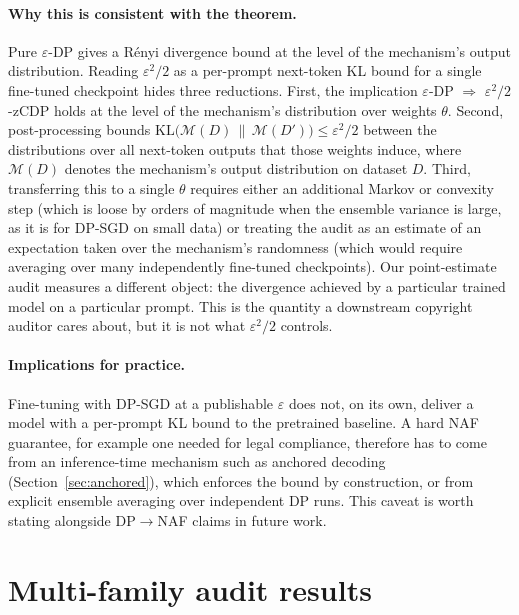 \documentclass{article}
\begin{document}
\paragraph{Why this is consistent with the theorem.}
Pure $\varepsilon$-DP gives a R\'enyi divergence bound at the level of the mechanism's output distribution.  Reading $\varepsilon^2/2$ as a per-prompt next-token KL bound for a single fine-tuned checkpoint hides three reductions.  First, the implication $\varepsilon$-DP $\Rightarrow$ $\varepsilon^2/2$-zCDP holds at the level of the mechanism's distribution over weights $\theta$.  Second, post-processing bounds $\mathrm{KL}\bigl(\mathcal M(D)\,\|\,\mathcal M(D')\bigr)\le\varepsilon^2/2$ between the distributions over all next-token outputs that those weights induce, where $\mathcal M(D)$ denotes the mechanism's output distribution on dataset $D$.  Third, transferring this to a single $\theta$ requires either an additional Markov or convexity step (which is loose by orders of magnitude when the ensemble variance is large, as it is for DP-SGD on small data) or treating the audit as an estimate of an expectation taken over the mechanism's randomness (which would require averaging over many independently fine-tuned checkpoints).  Our point-estimate audit measures a different object: the divergence achieved by a particular trained model on a particular prompt.  This is the quantity a downstream copyright auditor cares about, but it is not what $\varepsilon^2/2$ controls.

\paragraph{Implications for practice.}
Fine-tuning with DP-SGD at a publishable $\varepsilon$ does not, on its own, deliver a model with a per-prompt KL bound to the pretrained baseline.  A hard NAF guarantee, for example one needed for legal compliance, therefore has to come from an inference-time mechanism such as anchored decoding (Section~\ref{sec:anchored}), which enforces the bound by construction, or from explicit ensemble averaging over independent DP runs.  This caveat is worth stating alongside DP$\to$NAF claims in future work.


\section{Multi-family audit results}
\label{sec:results}
\end{document}
